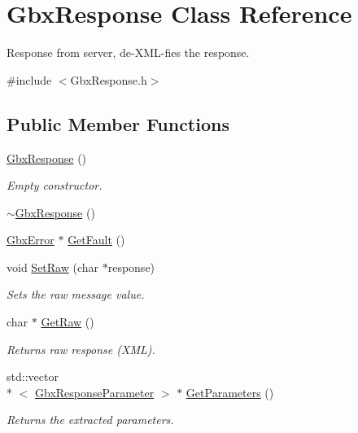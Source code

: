 \hypertarget{classGbxResponse}{\section{Gbx\-Response Class Reference}
\label{classGbxResponse}
}


Response from server, de-\/\-X\-M\-L-\/fies the response.  




{\ttfamily \#include $<$Gbx\-Response.\-h$>$}

\subsection*{Public Member Functions}
\begin{DoxyCompactItemize}
\item 
\hyperlink{classGbxResponse_ae29114aa0014ca50f3be6455bda1be47}{Gbx\-Response} ()
\begin{DoxyCompactList}\small\item\em Empty constructor. \end{DoxyCompactList}\item 
\hyperlink{classGbxResponse_a27e6c9c3452f2a0c90a33177af84236b}{$\sim$\-Gbx\-Response} ()
\item 
\hyperlink{structGbxError}{Gbx\-Error} $\ast$ \hyperlink{classGbxResponse_aaeb8f1ccd18ab88799d93ea78befc0df}{Get\-Fault} ()
\item 
void \hyperlink{classGbxResponse_aadd25f4d4c454bb837af9b442742ff70}{Set\-Raw} (char $\ast$response)
\begin{DoxyCompactList}\small\item\em Sets the raw message value. \end{DoxyCompactList}\item 
char $\ast$ \hyperlink{classGbxResponse_a3311b30d7e04c2a14eb5f675ad6e37cd}{Get\-Raw} ()
\begin{DoxyCompactList}\small\item\em Returns raw response (X\-M\-L). \end{DoxyCompactList}\item 
std\-::vector\\*
$<$ \hyperlink{classGbxResponseParameter}{Gbx\-Response\-Parameter} $>$ $\ast$ \hyperlink{classGbxResponse_a9323a43f94e895422a7ee29a1eb80cc3}{Get\-Parameters} ()
\begin{DoxyCompactList}\small\item\em Returns the extracted parameters. \end{DoxyCompactList}\end{DoxyCompactItemize}
